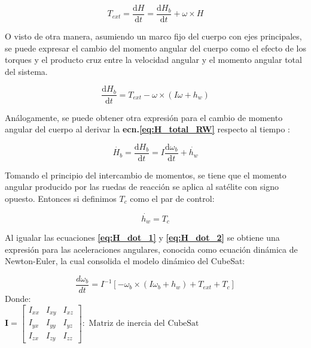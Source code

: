  \begin{equation}
 	T_{ext}= \frac{\mathrm{d} H}{\mathrm{d} t} = \frac{\mathrm{d} H_b}{\mathrm{d} t} + \omega \times H 	
 \end{equation}
 
 O visto de otra manera, asumiendo un marco fijo del cuerpo con ejes principales, se puede expresar el cambio del momento angular del cuerpo como el efecto de los torques y el producto cruz entre la velocidad angular y el momento angular total del sistema.
 
  \begin{equation}\label{eq:H_dot_1}
 	 \frac{\mathrm{d} H_b}{\mathrm{d} t} = T_{ext}-\omega \times \left(I\omega + h_w\right) 	
 \end{equation}
 
 Análogamente, se puede obtener otra expresión para el cambio de momento angular del cuerpo al derivar la \textbf{ecn.\eqref{eq:H_total_RW}} respecto al tiempo :
 
 \begin{equation}\label{eq:H_dot_2}
 	\dot{H_b} = \frac{\mathrm{d} H_b}{\mathrm{d} t} = 
 	I\frac{\mathrm{d} \omega_b}{\mathrm{d} t} + \dot{h_w}  	
 \end{equation}
 
Tomando el principio del intercambio de momentos, se tiene que el momento angular producido por las ruedas de reacción se aplica al satélite con signo opuesto. Entonces si definimos $T_c$ como el par de control:

\begin{equation}\label{eq:torque_h}
	\dot{h_w} = T_c  	
\end{equation}

Al igualar las ecuaciones \textbf{\eqref{eq:H_dot_1}} y \textbf{\eqref{eq:H_dot_2}} se obtiene una expresión para las aceleraciones angulares, conocida como ecuación dinámica de Newton-Euler, la cual consolida el modelo dinámico del CubeSat:


\begin{equation}\label{eq:modelo_dinamico}	
	 \frac{d \omega_b}{d t} = I^{-1}\left[-\omega_b \times\left(I \omega_b+h_w\right)+T_{ext}+T_c\right]	
\end{equation}
\newpage
\noindent Donde:\\[5pt]
$
\mathbf{I}=\left[\begin{array}{ccc}
	I_{x x} & I_{x y} & I_{x z} \\
	I_{y x} & I_{y y} & I_{y z} \\
	I_{z x} & I_{z y} & I_{z z}
\end{array}\right]:\text { Matriz de inercia del CubeSat }
$

